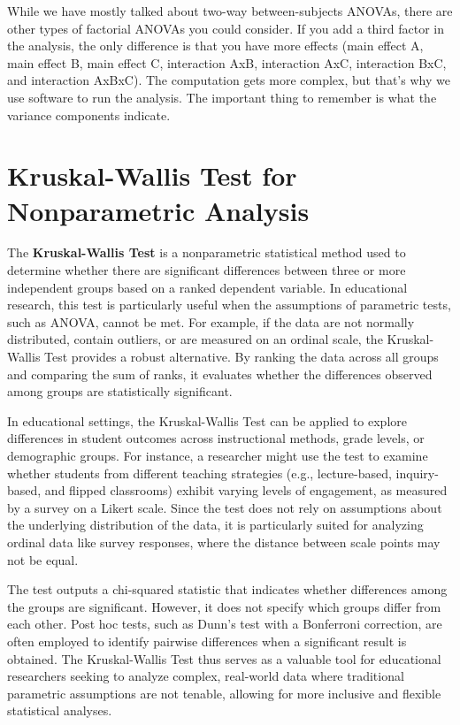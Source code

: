 \documentclass[
  letterpaper,
  DIV=11,
  numbers=noendperiod]{scrreprt}
\begin{document}
While we have mostly talked about two-way between-subjects ANOVAs, there
are other types of factorial ANOVAs you could consider. If you add a
third factor in the analysis, the only difference is that you have more
effects (main effect A, main effect B, main effect C, interaction AxB,
interaction AxC, interaction BxC, and interaction AxBxC). The
computation gets more complex, but that's why we use software to run the
analysis. The important thing to remember is what the variance
components indicate.

\section{Kruskal-Wallis Test for Nonparametric
Analysis}\label{kruskal-wallis-test-for-nonparametric-analysis}

The \textbf{Kruskal-Wallis Test} is a nonparametric statistical method
used to determine whether there are significant differences between
three or more independent groups based on a ranked dependent variable.
In educational research, this test is particularly useful when the
assumptions of parametric tests, such as ANOVA, cannot be met. For
example, if the data are not normally distributed, contain outliers, or
are measured on an ordinal scale, the Kruskal-Wallis Test provides a
robust alternative. By ranking the data across all groups and comparing
the sum of ranks, it evaluates whether the differences observed among
groups are statistically significant.

In educational settings, the Kruskal-Wallis Test can be applied to
explore differences in student outcomes across instructional methods,
grade levels, or demographic groups. For instance, a researcher might
use the test to examine whether students from different teaching
strategies (e.g., lecture-based, inquiry-based, and flipped classrooms)
exhibit varying levels of engagement, as measured by a survey on a
Likert scale. Since the test does not rely on assumptions about the
underlying distribution of the data, it is particularly suited for
analyzing ordinal data like survey responses, where the distance between
scale points may not be equal.

The test outputs a chi-squared statistic that indicates whether
differences among the groups are significant. However, it does not
specify which groups differ from each other. Post hoc tests, such as
Dunn's test with a Bonferroni correction, are often employed to identify
pairwise differences when a significant result is obtained. The
Kruskal-Wallis Test thus serves as a valuable tool for educational
researchers seeking to analyze complex, real-world data where
traditional parametric assumptions are not tenable, allowing for more
inclusive and flexible statistical analyses.
\end{document}
